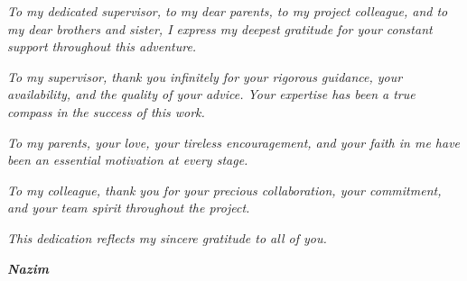 \begin{center}
    \textit{To my dedicated supervisor, to my dear parents, to my project colleague, and to my dear brothers and sister, I express my deepest gratitude for your constant support throughout this adventure.}
\end{center}

\begin{center}
    \textit{To my supervisor, thank you infinitely for your rigorous guidance, your availability, and the quality of your advice. Your expertise has been a true compass in the success of this work.}
\end{center}

\begin{center}
    \textit{To my parents, your love, your tireless encouragement, and your faith in me have been an essential motivation at every stage.}
\end{center}

\begin{center}
    \textit{To my colleague, thank you for your precious collaboration, your commitment, and your team spirit throughout the project.}
\end{center}

\begin{center}
    \textit{This dedication reflects my sincere gratitude to all of you.}
\end{center}

\begin{center}
    \textbf{\textit{Nazim}}
\end{center}